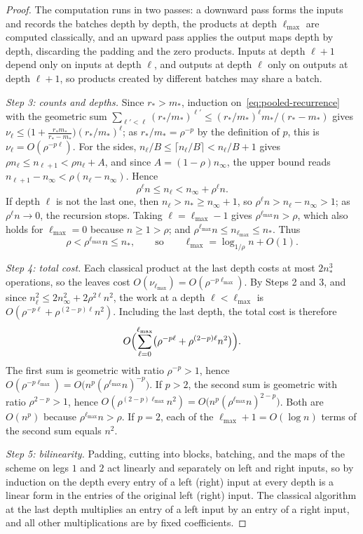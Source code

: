 \begin{proof}
The computation runs in two passes: a downward pass forms the inputs and
records the batches depth by depth, the products at depth \(\ell_{\max}\)
are computed classically, and an upward pass applies the output maps depth
by depth, discarding the padding and the zero products. Inputs at depth
\(\ell+1\) depend only on inputs at depth \(\ell\), and outputs at
depth \(\ell\) only on outputs at depth \(\ell+1\), so products created
by different batches may share a batch.

\emph{Step 3: counts and depths.} Since \(r_*>m_*\), induction
on~\eqref{eq:pooled-recurrence} with the geometric sum
\(\sum_{\ell'<\ell}(r_*/m_*)^{\ell'}\le(r_*/m_*)^\ell m_*/(r_*-m_*)\) gives
\(\nu_\ell\le\bigl(1+\frac{r_*m_*}{r_*-m_*}\bigr)(r_*/m_*)^\ell\); as
\(r_*/m_*=\rho^{-p}\) by the definition of \(p\), this is
\(\nu_\ell=O(\rho^{-p\ell})\). For the sides,
\(n_\ell/B\le\lceil n_\ell/B\rceil<n_\ell/B+1\) gives
\(\rho n_\ell\le n_{\ell+1}<\rho n_\ell+A\), and since
\(A=(1-\rho)n_\infty\), the upper bound reads
\(n_{\ell+1}-n_\infty<\rho(n_\ell-n_\infty)\). Hence
\[
 \rho^\ell n\le n_\ell<n_\infty+\rho^\ell n .
\]
If depth \(\ell\) is not the last one, then \(n_\ell>n_*\ge n_\infty+1\),
so \(\rho^\ell n>n_\ell-n_\infty>1\); as \(\rho^\ell n\to0\), the
recursion stops. Taking \(\ell=\ell_{\max}-1\) gives
\(\rho^{\ell_{\max}}n>\rho\), which also holds for \(\ell_{\max}=0\)
because \(n\ge1>\rho\); and \(\rho^{\ell_{\max}}n\le n_{\ell_{\max}}\le
n_*\). Thus
\[
 \rho<\rho^{\ell_{\max}}n\le n_*,\qquad\text{so}\qquad
 \ell_{\max}=\log_{1/\rho}n+O(1).
\]

\emph{Step 4: total cost.} Each classical product at the last depth costs
at most \(2n_*^3\) operations, so the leaves cost
\(O(\nu_{\ell_{\max}})=O(\rho^{-p\ell_{\max}})\). By Steps 2 and 3, and
since \(n_\ell^2\le2n_\infty^2+2\rho^{2\ell}n^2\), the work at a depth
\(\ell<\ell_{\max}\) is \(O(\rho^{-p\ell}+\rho^{(2-p)\ell}n^2)\).
Including the last depth, the total cost is therefore
\[
 O\Bigl(\sum_{\ell=0}^{\ell_{\max}}
 \bigl(\rho^{-p\ell}+\rho^{(2-p)\ell}n^2\bigr)\Bigr).
\]
The first sum is geometric with ratio \(\rho^{-p}>1\), hence
\(O(\rho^{-p\ell_{\max}})=O\bigl(n^p(\rho^{\ell_{\max}}n)^{-p}\bigr)\). If
\(p>2\), the second sum is geometric with ratio \(\rho^{2-p}>1\), hence
\(O(\rho^{(2-p)\ell_{\max}}n^2)=O\bigl(n^p(\rho^{\ell_{\max}}n)^{2-p}\bigr)\).
Both are \(O(n^p)\) because \(\rho^{\ell_{\max}}n>\rho\). If \(p=2\), each
of the \(\ell_{\max}+1=O(\log n)\) terms of the second sum equals \(n^2\).

\emph{Step 5: bilinearity.} Padding, cutting into blocks, batching, and the
maps of the scheme on legs \(1\) and \(2\) act linearly and separately on
left and right inputs, so by induction on the depth every entry of a left
(right) input at every depth is a linear form in the entries of the
original left (right) input. The classical algorithm at the last depth
multiplies an entry of a left input by an entry of a right input, and all
other multiplications are by fixed coefficients.
\end{proof}
